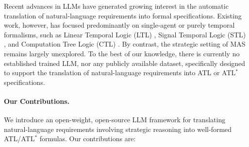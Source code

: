Recent advances in LLMs have generated growing interest in the automatic translation of natural-language requirements into formal specifications. Existing work, however, has focused predominantly on single-agent or purely temporal formalisms, such as Linear Temporal Logic (LTL) \cite{pnueli1977temporal}, Signal Temporal Logic (STL) \cite{maler2004monitoring}, and Computation Tree Logic (CTL) \cite{clarke1981design}. By contrast, the strategic setting of MAS remains largely unexplored. To the best of our knowledge, there is currently no established trained LLM, nor any publicly available dataset, specifically designed to support the translation of natural-language requirements into ATL or ATL$^\ast$ specifications.

\paragraph{Our Contributions.}
We introduce an open-weight, open-source LLM framework for translating natural-language requirements involving strategic reasoning into well-formed ATL/ATL$^\ast$ formulas. Our contributions are:

